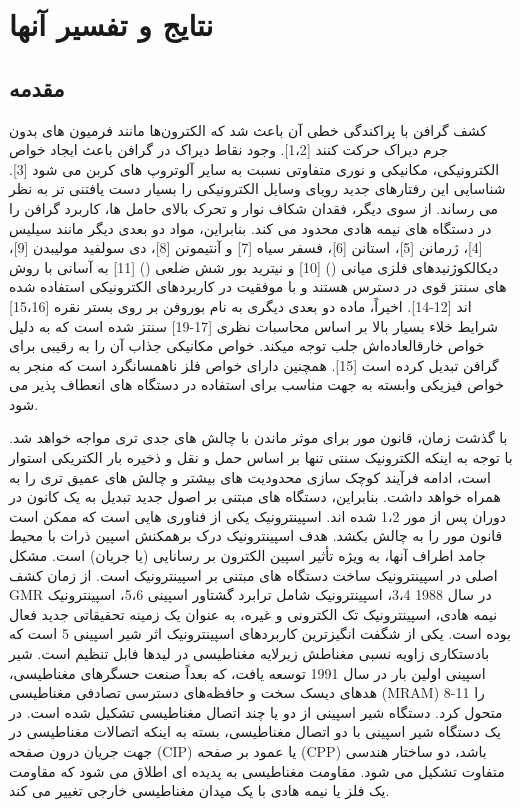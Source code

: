 \chapter{نتایج و تفسیر آنها}
\clearpage
\section{مقدمه}
کشف گرافن با پراکندگی خطی آن باعث شد که الکترون‌ها مانند فرمیون های بدون جرم دیراک حرکت کنند [1،2]. وجود نقاط دیراک در گرافن باعث ایجاد خواص الکترونیکی، مکانیکی و نوری متفاوتی نسبت به سایر آلوتروپ های کربن می شود [3]. شناسایی این رفتارهای جدید رویای وسایل الکترونیکی را بسیار دست یافتنی تر به نظر می رساند. از سوی دیگر، فقدان شکاف نوار و تحرک بالای حامل ها، کاربرد گرافن را در دستگاه های نیمه هادی محدود می کند. بنابراین، مواد دو بعدی دیگر مانند سیلیس [4]، ژرمانن [5]، استانن [6]، فسفر سیاه [7] و آنتیمونن [8]، دی سولفید مولیبدن [9]، دیکالکوژنیدهای فلزی میانی () [10] و نیترید بور شش ضلعی () [11] به آسانی با روش های سنتز قوی در دسترس هستند و با موفقیت در کاربردهای الکترونیکی استفاده شده اند [12-14]. اخیراً، ماده دو بعدی دیگری به نام بوروفن بر روی بستر نقره [15،16] شرایط خلاء بسیار بالا بر اساس محاسبات نظری [17-19] سنتز شده است که به دلیل خواص خارقالعاده‌اش جلب توجه میکند. خواص مکانیکی جذاب آن را به رقیبی برای گرافن تبدیل کرده است [15]. همچنین دارای خواص فلز ناهمسانگرد است که منجر به خواص فیزیکی وابسته به جهت مناسب برای استفاده در دستگاه های انعطاف پذیر می شود.

با گذشت زمان، قانون مور برای موثر ماندن با چالش های جدی تری مواجه خواهد شد. با توجه به اینکه الکترونیک سنتی تنها بر اساس حمل و نقل و ذخیره بار الکتریکی استوار است، ادامه فرآیند کوچک سازی محدودیت های بیشتر و چالش های عمیق تری را به همراه خواهد داشت. بنابراین، دستگاه های مبتنی بر اصول جدید تبدیل به یک کانون در دوران پس از مور 1،2 شده اند. اسپینترونیک یکی از فناوری هایی است که ممکن است قانون مور را به چالش بکشد. هدف اسپینترونیک درک برهمکنش اسپین ذرات با محیط جامد اطراف آنها، به ویژه تأثیر اسپین الکترون بر رسانایی (یا جریان) است. مشکل اصلی در اسپینترونیک ساخت دستگاه های مبتنی بر اسپینترونیک است. از زمان کشف GMR در سال 1988 3،4، اسپینترونیک شامل ترابرد گشتاور اسپینی 5،6، اسپینترونیک نیمه هادی، اسپینترونیک تک الکترونی و غیره، به عنوان یک زمینه تحقیقاتی جدید فعال بوده است. یکی از شگفت انگیزترین کاربردهای اسپینترونیک اثر شیر اسپینی 5 است که بادستکاری زاویه نسبی مغناطش زیرلایه مغناطیسی در لیدها فابل تنظیم است. شیر اسپینی اولین بار در سال 1991 توسعه یافت، که بعداً صنعت حسگرهای مغناطیسی، هدهای دیسک سخت و حافظه‌های دسترسی تصادفی مغناطیسی (MRAM) 8-11 را متحول کرد. دستگاه شیر اسپینی از دو یا چند اتصال مغناطیسی تشکیل شده است. در یک دستگاه شیر اسپینی با دو اتصال مغناطیسی، بسته به اینکه اتصالات مغناطیسی در جهت جریان درون صفحه (CIP) یا عمود بر صفحه (CPP) باشد، دو ساختار هندسی متفاوت تشکیل می شود. مقاومت مغناطیسی به پدیده ای اطلاق می شود که مقاومت یک فلز یا نیمه هادی با یک میدان مغناطیسی خارجی تغییر می کند.

